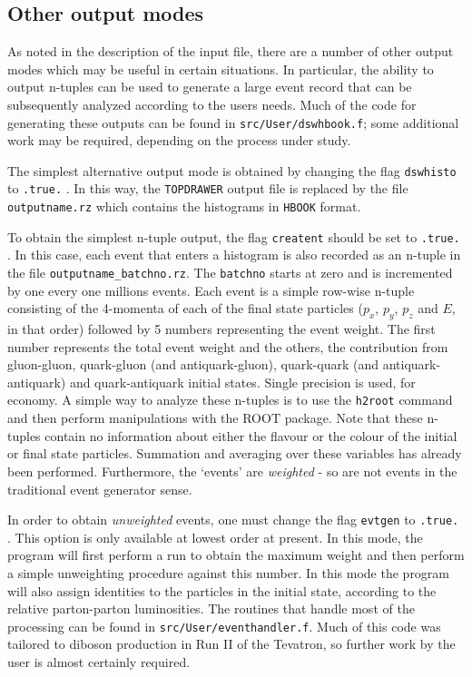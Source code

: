 \documentclass[12pt]{article}
\begin{document}
\subsection{Other output modes}
\label{subsec:otheroutput}
As noted in the description of the input file, there are a number of other
output modes which may be useful in certain situations. In particular, the
ability to output n-tuples can be used to generate a large event record that 
can be subsequently analyzed according to the users needs. Much of the code
for generating these outputs can be found in {\tt src/User/dswhbook.f}; some
additional work may be required, depending on the process under study.

The simplest alternative output mode is obtained by changing the flag
{\tt dswhisto} to {\tt .true.} . In this way, the {\tt TOPDRAWER} output file is
replaced by the file {\tt outputname.rz} which contains the histograms in {\tt HBOOK}
format.

To obtain the simplest n-tuple output, the flag {\tt creatent} should be set
to {\tt .true.} . In this case, each event that enters a histogram
is also recorded as an n-tuple in the file {\tt outputname\_batchno.rz}. The {\tt batchno}
starts at zero and is incremented by one every one millions events. Each event
is a simple row-wise n-tuple consisting of the 4-momenta of each of the final
state particles ($p_x$, $p_y$, $p_z$ and $E$, in that order) followed by 5 numbers
representing the event weight. The first number represents the total event weight
and the others, the contribution from gluon-gluon, quark-gluon (and antiquark-gluon),
quark-quark (and antiquark-antiquark) and quark-antiquark initial states. 
Single precision is used, for economy. A simple way to analyze 
these n-tuples is to use the {\tt h2root} command and then perform
manipulations with the ROOT package. Note that these n-tuples contain
no information about either the flavour or the colour of the initial or final
state particles. Summation and averaging over these variables has already been
performed. Furthermore, the `events' are {\it weighted} - so are not events
in the traditional event generator sense.

In order to obtain {\it unweighted} events, one must change the flag
{\tt evtgen} to {\tt .true.} . This option is only available at lowest order
at present. In this mode, the program will first perform a run to obtain the
maximum weight and then perform a simple unweighting procedure against this
number. In this mode the program will also assign identities to the
particles in the initial state, according to the relative parton-parton
luminosities. The routines that handle most of the processing can be found
in {\tt src/User/eventhandler.f}. Much of this code was tailored to diboson
production in Run II of the Tevatron, so further work by the user is almost
certainly required.
\end{document}
